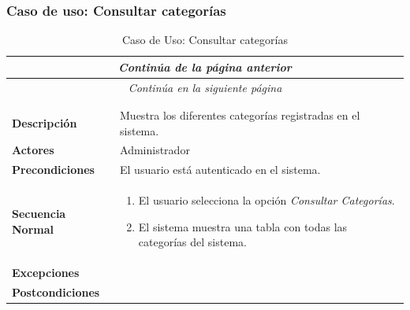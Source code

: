 \newpage
\subsubsection*{Caso de uso: Consultar categorías }
\begin{longtable}{| p{4cm} | p{10cm} |}
\endfirsthead
\multicolumn{2}{c}{\textit{Continúa de la página anterior}}\\[12pt]
\hline
\endhead
\hline
\multicolumn{2}{c}{\textit{Continúa en la siguiente página}} \\
\endfoot
\hline
\caption{Caso de Uso: Consultar categorías}\label{fig:1}\\
\endlastfoot


\hline
\multicolumn{2}{|c|}{\textbf{CU$<$41$>$ - Consultar Categorías}} \\

\hline
\textbf{Descripción} &
Muestra los diferentes categorías registradas en el sistema.\\

\hline
\textbf{Actores} &
Administrador\\

\hline
\textbf{Precondiciones} &
El usuario está autenticado en el sistema.\\

\hline
\textbf{Secuencia Normal} &\mbox{}\par\vspace{-\baselineskip}
\begin{enumerate}[leftmargin=0.7cm, topsep=0.1cm]
\item El usuario selecciona la opción \textit{Consultar Categorías}.
\item El sistema muestra una tabla con todas las categorías del sistema.
\end{enumerate}


\\
\hline
\textbf{Excepciones} &\mbox{}\par\vspace{-\baselineskip}
\\

\hline
\textbf{Postcondiciones} & \\
\hline
\end{longtable}



\newpage
